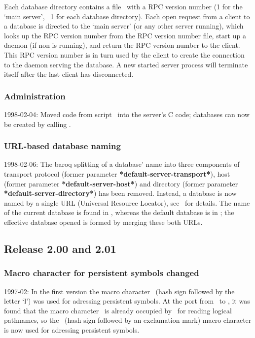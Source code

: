 Each database directory contains a file \ with a RPC
version number (1 for the `main server', \gt\ 1 for each database
directory). Each open request from a client to a database is directed
to the `main server' (or any other server running), which looks up the
RPC version number from the RPC version number file, start up a daemon
(if non is running), and return the RPC version number to the client.
This RPC version number is in turn used by the client to create the
connection to the daemon serving the database.  A new started server
process will terminate itself after the last client has disconnected.

\subsubsection{Administration}

1998-02-04: Moved code from script \ into the
server's C code; databases can now be created by calling
.

\subsubsection{URL-based database naming}

1998-02-06: The baroq splitting of a database' name into three
components of transport protocol (former parameter
\textbf{*default-server-transport*}), host (former parameter
\textbf{*default-server-host*}) and directory (former parameter
\textbf{*default-server-directory*}) has been removed. Instead, a
database is now named by a single URL (Universal Resource Locator),
see \ for details. The name of the current database is
found in , whereas the default database is in
; the effective database opened is
formed by merging these both URLs.

\subsection{Release 2.00 and 2.01}

\subsubsection{Macro character for persistent symbols changed}

1997-02: In the first version the macro character \ (hash
sign followed by the letter `l') was used for adressing persistent
symbols.  At the port from \lw\ to \allegro, it was found that the
macro character \ is already occupied by \allegro\ for
reading logical pathnames, so the \lisp{\#!}\ (hash sign followed by
an exclamation mark) macro character is now used for adressing
persistent symbols.

